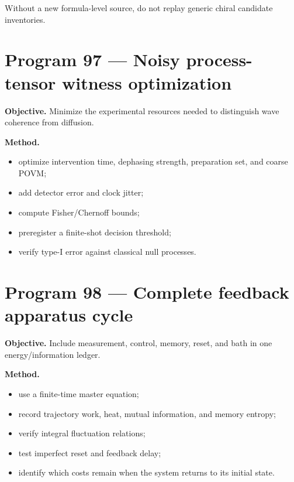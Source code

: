 \documentclass[11pt,a4paper,openany]{report}
\begin{document}
Without a new formula-level source, do not replay generic chiral candidate inventories.

\section{Program 97 --- Noisy process-tensor witness optimization}

\textbf{Objective.} Minimize the experimental resources needed to distinguish wave coherence from diffusion.

\textbf{Method.}

\begin{itemize}
\item 
optimize intervention time, dephasing strength, preparation set, and coarse POVM;

\item 
add detector error and clock jitter;

\item 
compute Fisher/\allowbreak{}Chernoff bounds;

\item 
preregister a finite-shot decision threshold;

\item 
verify type-I error against classical null processes.

\end{itemize}

\section{Program 98 --- Complete feedback apparatus cycle}

\textbf{Objective.} Include measurement, control, memory, reset, and bath in one energy/\allowbreak{}information ledger.

\textbf{Method.}

\begin{itemize}
\item 
use a finite-time master equation;

\item 
record trajectory work, heat, mutual information, and memory entropy;

\item 
verify integral fluctuation relations;

\item 
test imperfect reset and feedback delay;

\item 
identify which costs remain when the system returns to its initial state.

\end{itemize}
\end{document}
